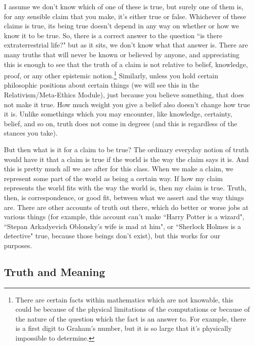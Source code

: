 I assume we don’t know which of one of these is true, but surely one of them is, for any sensible claim that you make, it's either true or false. Whichever of these claims is true, its being true doesn’t depend in any way on whether or how we know it to be true. So, there is a correct answer to the question ``is there extraterrestrial life?" but as it sits, we don't know what that answer is. There are many truths that will never be known or believed by anyone, and appreciating this is enough to see that the truth of a claim is not relative to belief, knowledge, proof, or any other epistemic notion.\footnote{There are certain facts within mathematics which are not knowable, this could be because of the physical limitations of the computations or because of the nature of the question which the fact is an answer to. For example, there is a first digit to Graham's number, but it is so large that it's physically impossible to determine.} Similarly, unless you hold certain philosophic positions about certain things (we will see this in the Relativism/Meta-Ethics Module), just because you believe something, that does not make it true. How much weight you give a belief also doesn't change how true it is. Unlike somethings which you may encounter, like knowledge, certainty, belief, and so on, truth does not come in degrees (and this is regardless of the stances you take). 

But then what is it for a claim to be true? The ordinary everyday notion of truth would have it that a claim is true if the world is the way the claim says it is. And this is pretty much all we are after for this class. When we make a claim, we represent some part of the world as being a certain way. If how my claim represents the world fits with the way the world is, then my claim is true. Truth, then, is correspondence, or good fit, between what we assert and the way things are. There are other accounts of truth out there, which do better or worse jobs at various things (for example, this account can't make ``Harry Potter is a wizard"\autocite{HarryPotter1}, ``Stepan Arkadyevich Oblonsky's wife is mad at him"\autocite{AnnaKarenina}, or ``Sherlock Holmes is a detective"\autocite{Sherlock} true, because those beings don't exist), but this works for our purposes.  

\subsection{Truth and Meaning}
\label{s:p1.1.2}

